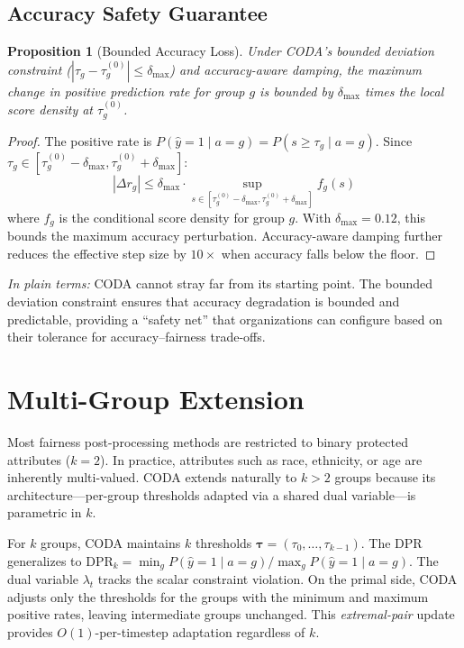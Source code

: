 \documentclass[letterpaper]{article} %
\newtheorem{proposition}[theorem]{Proposition}
\theoremstyle{definition}
\begin{document}
\subsection{Accuracy Safety Guarantee}

\begin{proposition}[Bounded Accuracy Loss]
\label{prop:accuracy}
Under CODA's bounded deviation constraint ($|\tau_g - \tau_g^{(0)}| \leq \delta_{\max}$) and accuracy-aware damping, the maximum change in positive prediction rate for group $g$ is bounded by $\delta_{\max}$ times the local score density at $\tau_g^{(0)}$.
\end{proposition}

\begin{proof}
The positive rate is $P(\hat{y}=1 \mid a=g) = P(s \geq \tau_g \mid a=g)$. Since $\tau_g \in [\tau_g^{(0)} - \delta_{\max}, \tau_g^{(0)} + \delta_{\max}]$:
\[
|\Delta r_g| \leq \delta_{\max} \cdot \sup_{s \in [\tau_g^{(0)} - \delta_{\max}, \tau_g^{(0)} + \delta_{\max}]} f_g(s)
\]
where $f_g$ is the conditional score density for group $g$. With $\delta_{\max} = 0.12$, this bounds the maximum accuracy perturbation. Accuracy-aware damping further reduces the effective step size by $10\times$ when accuracy falls below the floor.
\end{proof}

\emph{In plain terms:} CODA cannot stray far from its starting point. The bounded deviation constraint ensures that accuracy degradation is bounded and predictable, providing a ``safety net'' that organizations can configure based on their tolerance for accuracy--fairness trade-offs.


\section{Multi-Group Extension}
\label{sec:multigroup}

Most fairness post-processing methods are restricted to binary protected attributes ($k=2$). In practice, attributes such as race, ethnicity, or age are inherently multi-valued. CODA extends naturally to $k > 2$ groups because its architecture---per-group thresholds adapted via a shared dual variable---is parametric in $k$.

For $k$ groups, CODA maintains $k$ thresholds $\boldsymbol{\tau} = (\tau_0, \ldots, \tau_{k-1})$. The DPR generalizes to $\text{DPR}_k = \min_g P(\hat{y}=1 \mid a=g) / \max_g P(\hat{y}=1 \mid a=g)$. The dual variable $\lambda_t$ tracks the scalar constraint violation. On the primal side, CODA adjusts only the thresholds for the groups with the minimum and maximum positive rates, leaving intermediate groups unchanged. This \emph{extremal-pair} update provides $O(1)$-per-timestep adaptation regardless of $k$.
\end{document}
